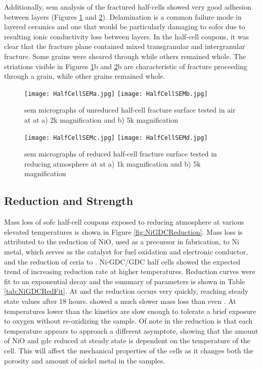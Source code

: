 Additionally, \gls{sem} analysis of the fractured half-cells showed very good adhesion between layers (Figures \ref{fig:HalfCellSEMa} and \ref{fig:HalfCellSEMb}).
Delamination is a common failure mode in layered ceramics and one that would be particularly damaging to \glspl{sofc} due to resulting ionic conductivity loss between layers.\cite{Sevecek2016}
In the half-cell coupons, it was clear that the fracture plane contained mixed transgranular and intergranular fracture.
Some grains were sheared through while others remained whole.
The striations visible in Figures \ref{fig:HalfCellSEMa}b and \ref{fig:HalfCellSEMb}b are characteristic of fracture proceeding through a grain, while other grains remained whole.
\begin{figure}
    \texttt{[image: HalfCellSEMa.jpg]}
    \texttt{[image: HalfCellSEMb.jpg]}
    \caption{\Gls{sem} micrographs of unreduced half-cell fracture surface tested in air at  at a) 2k magnification and b) 5k magnification}
    \label{fig:HalfCellSEMa}
\end{figure}

\begin{figure}
    \texttt{[image: HalfCellSEMc.jpg]}
    \texttt{[image: HalfCellSEMd.jpg]}
    \caption{\Gls{sem} micrographs of reduced half-cell fracture surface tested in reducing atmosphere at  at a) 1k magnification and b) 5k magnification}
    \label{fig:HalfCellSEMb}
\end{figure}

\subsection{Reduction and Strength}

Mass loss of \gls{sofc} half-cell coupons exposed to reducing atmosphere at various elevated temperatures is shown in Figure \ref{fig:NiGDCReduction}.
Mass loss is attributed to the reduction of NiO, used as a precursor in fabrication,
to Ni metal, which serves as the catalyst for fuel oxidation and electronic conductor, and the reduction of ceria to .
Ni-GDC/GDC half cells showed the expected trend of increasing reduction rate at higher temperatures.
Reduction curves were fit to an exponential decay and the summary of parameters is shown in Table \ref{tab:NiGDCRedFit}.
At  and  the reduction occurs very quickly,
reaching steady state values after 18 hours.  showed a much slower mass loss than even .
At temperatures lower than  the kinetics are slow enough to tolerate a brief exposure to oxygen without re-oxidizing the sample.
Of note in the reduction is that each temperature appears to approach a different asymptote, showing that the amount of NiO and \gls{gdc} reduced at steady state is dependent on the temperature of the cell.
This will affect the mechanical properties of the cells as it changes both the porosity and amount of nickel metal in the samples.


